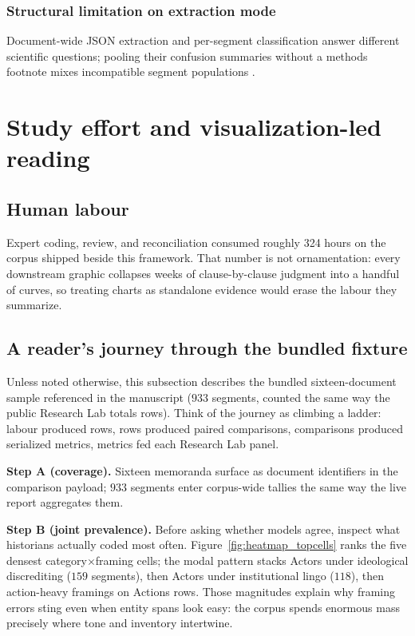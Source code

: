 \documentclass[11pt,a4paper]{article}
\theoremstyle{remark}
\begin{document}
\subsubsection{Structural limitation on extraction mode}
Document-wide JSON extraction and per-segment classification answer different scientific questions; pooling their confusion summaries without a methods footnote mixes incompatible segment populations \citep{extractbench2026}.

\section{Study effort and visualization-led reading}
\label{sec:results}

\subsection{Human labour}
Expert coding, review, and reconciliation consumed roughly 324 hours on the corpus shipped beside this framework. That number is not ornamentation: every downstream graphic collapses weeks of clause-by-clause judgment into a handful of curves, so treating charts as standalone evidence would erase the labour they summarize.

\subsection{A reader's journey through the bundled fixture}
\label{sec:fixture_journey}

Unless noted otherwise, this subsection describes the bundled sixteen-document sample referenced in the manuscript ($933$ segments, counted the same way the public Research Lab totals rows). Think of the journey as climbing a ladder: labour produced rows, rows produced paired comparisons, comparisons produced serialized metrics, metrics fed each Research Lab panel.

\textbf{Step A (coverage).} Sixteen memoranda surface as document identifiers in the comparison payload; $933$ segments enter corpus-wide tallies the same way the live report aggregates them.

\textbf{Step B (joint prevalence).} Before asking whether models agree, inspect what historians actually coded most often. Figure~\ref{fig:heatmap_topcells} ranks the five densest category$\times$framing cells; the modal pattern stacks Actors under ideological discrediting ($159$ segments), then Actors under institutional lingo ($118$), then action-heavy framings on Actions rows. Those magnitudes explain why framing errors sting even when entity spans look easy: the corpus spends enormous mass precisely where tone and inventory intertwine.
\end{document}
